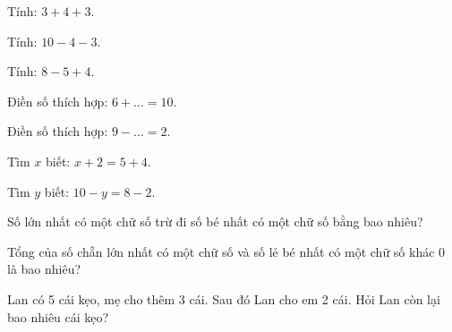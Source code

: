 \begin{ex}
Tính: $3 + 4 + 3$.
\end{ex}

\begin{ex}
Tính: $10 - 4 - 3$.
\end{ex}

\begin{ex}
Tính: $8 - 5 + 4$.
\end{ex}

\begin{ex}
Điền số thích hợp: $6 + \dots = 10$.
\end{ex}

\begin{ex}
Điền số thích hợp: $9 - \dots = 2$.
\end{ex}

\begin{ex}
Tìm $x$ biết: $x + 2 = 5 + 4$.
\end{ex}

\begin{ex}
Tìm $y$ biết: $10 - y = 8 - 2$.
\end{ex}

\begin{ex}
Số lớn nhất có một chữ số trừ đi số bé nhất có một chữ số bằng bao nhiêu?
\end{ex}

\begin{ex}
Tổng của số chẵn lớn nhất có một chữ số và số lẻ bé nhất có một chữ số khác 0 là bao nhiêu?
\end{ex}

\begin{ex}
Lan có 5 cái kẹo, mẹ cho thêm 3 cái. Sau đó Lan cho em 2 cái. Hỏi Lan còn lại bao nhiêu cái kẹo?
\end{ex}

